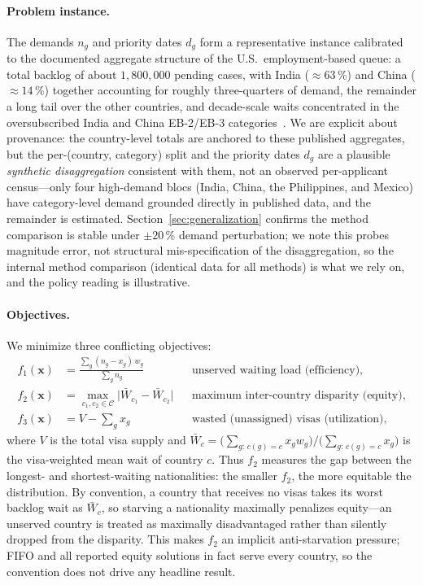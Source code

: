 \documentclass[runningheads]{llncs}
\begin{document}
\paragraph{Problem instance.}
The demands $n_g$ and priority dates $d_g$ form a representative instance calibrated to the documented aggregate structure of the U.S.\ employment-based queue: a total backlog of about $1{,}800{,}000$ pending cases, with India ($\approx 63\,\%$) and China ($\approx 14\,\%$) together accounting for roughly three-quarters of demand, the remainder a long tail over the other countries, and decade-scale waits concentrated in the oversubscribed India and China EB-2/EB-3 categories~\cite{cato,dos}. We are explicit about provenance: the country-level totals are anchored to these published aggregates, but the per-(country, category) split and the priority dates $d_g$ are a plausible \emph{synthetic disaggregation} consistent with them, not an observed per-applicant census---only four high-demand blocs (India, China, the Philippines, and Mexico) have category-level demand grounded directly in published data, and the remainder is estimated. Section~\ref{sec:generalization} confirms the method comparison is stable under $\pm 20\,\%$ demand perturbation; we note this probes magnitude error, not structural mis-specification of the disaggregation, so the internal method comparison (identical data for all methods) is what we rely on, and the policy reading is illustrative.

\paragraph{Objectives.}
We minimize three conflicting objectives:
\begin{align}
f_1(\mathbf{x}) &= \frac{\sum_{g}(n_g - x_g)\,w_g}{\sum_{g} n_g}
&&\text{unserved waiting load (efficiency),}\\
f_2(\mathbf{x}) &= \max_{c_1,c_2 \in \mathcal{C}}\bigl|\bar{W}_{c_1} - \bar{W}_{c_2}\bigr|
&&\text{maximum inter-country disparity (equity),}\\
f_3(\mathbf{x}) &= V - \textstyle\sum_{g} x_g
&&\text{wasted (unassigned) visas (utilization),}
\end{align}
where $V$ is the total visa supply and $\bar{W}_c = \big(\sum_{g:\,c(g)=c} x_g w_g\big)\big/\big(\sum_{g:\,c(g)=c} x_g\big)$ is the visa-weighted mean wait of country $c$. Thus $f_2$ measures the gap between the longest- and shortest-waiting nationalities: the smaller $f_2$, the more equitable the distribution. By convention, a country that receives no visas takes its worst backlog wait as $\bar{W}_c$, so starving a nationality maximally penalizes equity---an unserved country is treated as maximally disadvantaged rather than silently dropped from the disparity. This makes $f_2$ an implicit anti-starvation pressure; FIFO and all reported equity solutions in fact serve every country, so the convention does not drive any headline result.
\end{document}
